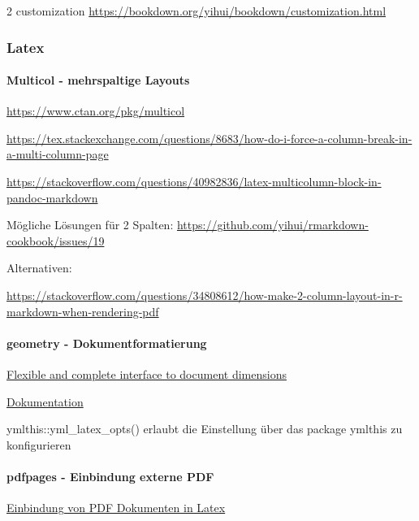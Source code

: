 \documentclass[
  a4paper,
  twoside]{article}
\let\oldparagraph\paragraph
\renewcommand{\paragraph}[1]{\oldparagraph{#1}\mbox{}}
\begin{document}
\begin {multicols}{2}
customization \url{https://bookdown.org/yihui/bookdown/customization.html}

\hypertarget{latex}{%
\subsubsection{Latex}\label{latex}}

\hypertarget{multicol---mehrspaltige-layouts}{%
\paragraph{Multicol - mehrspaltige Layouts}\label{multicol---mehrspaltige-layouts}}

\url{https://www.ctan.org/pkg/multicol}

\url{https://tex.stackexchange.com/questions/8683/how-do-i-force-a-column-break-in-a-multi-column-page}

\url{https://stackoverflow.com/questions/40982836/latex-multicolumn-block-in-pandoc-markdown}

Mögliche Lösungen für 2 Spalten:
\url{https://github.com/yihui/rmarkdown-cookbook/issues/19}

Alternativen:

\url{https://stackoverflow.com/questions/34808612/how-make-2-column-layout-in-r-markdown-when-rendering-pdf}

\hypertarget{geometry---dokumentformatierung}{%
\paragraph{geometry - Dokumentformatierung}\label{geometry---dokumentformatierung}}

\href{https://ctan.org/pkg/geometry?lang=en}{Flexible and complete interface to document dimensions}

\href{http://mirrors.ctan.org/macros/latex/contrib/geometry/geometry-de.pdf}{Dokumentation}

ymlthis::yml\_latex\_opts() erlaubt die Einstellung über das package ymlthis zu konfigurieren

\hypertarget{pdfpages---einbindung-externe-pdf}{%
\paragraph{pdfpages - Einbindung externe PDF}\label{pdfpages---einbindung-externe-pdf}}

\href{https://ctan.org/pkg/pdfpages}{Einbindung von PDF Dokumenten in Latex}


\end{multicols}
\end{document}
